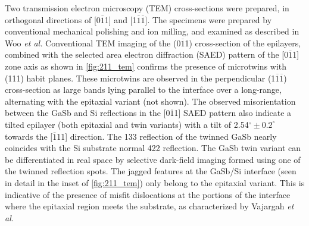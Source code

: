 Two transmission electron microscopy (TEM) cross-sections were prepared, in orthogonal directions of [0$\overline{1}$1] and [1$\overline{1}\overline{1}$]. The specimens were prepared by conventional mechanical polishing and ion milling, and examined as described in Woo \textit{et al.}\cite{Woo2012} Conventional TEM imaging of the (0$\overline{1}$1) cross-section of the epilayers, combined with the selected area electron diffraction (SAED) pattern of the [0$\overline{1}$1] zone axis as shown in \cref{fig:211_tem} confirms the presence of microtwins with (111) habit planes. These microtwins are observed in the perpendicular (1$\overline{1}\overline{1}$) cross-section as large bands lying parallel to the interface over a long-range, alternating with the epitaxial variant (not shown). The observed misorientation between the GaSb and Si reflections in the [0$\overline{1}$1] SAED pattern also indicate a tilted epilayer (both epitaxial and twin variants) with a tilt of 2.54$^\circ \pm 0.2^\circ$ towards the [$\overline{1}$11] direction. The 133 reflection of the twinned GaSb nearly coincides with the Si substrate normal 422 reflection. The GaSb twin variant can be differentiated in real space by selective dark-field imaging formed using one of the twinned reflection spots. The jagged features at the GaSb/Si interface (seen in detail in the inset of \cref{fig:211_tem}) only belong to the epitaxial variant. This is indicative of the presence of misfit dislocations at the portions of the interface where the epitaxial region meets the substrate, as characterized by Vajargah \textit{et al.}\cite{Vajargah2011b}
